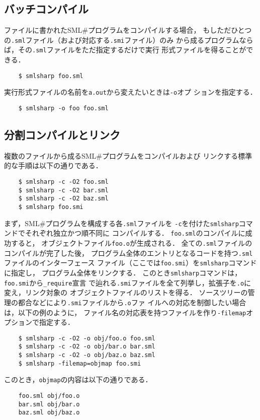 \documentclass{jbook}
\newcommand{\smlsharp}{SML\#}
\begin{document}
\subsection{バッチコンパイル}

	ファイルに書かれた\smlsharp{}プログラムをコンパイルする場合，
もしただひとつの{\tt .sml}ファイル（および対応する{\tt .smi}ファイル）のみ
から成るプログラムならば，その{\tt .sml}ファイルをただ指定するだけで実行
形式ファイルを得ることができる．
\begin{verbatim}
    $ smlsharp foo.sml
\end{verbatim}
	実行形式ファイルの名前を{\tt a.out}から変えたいときは{\tt -o}オプ
ションを指定する．
\begin{verbatim}
    $ smlsharp -o foo foo.sml
\end{verbatim}

\subsection{分割コンパイルとリンク}

	複数のファイルから成る\smlsharp{}プログラムをコンパイルおよび
リンクする標準的な手順は以下の通りである．
\begin{verbatim}
    $ smlsharp -c -O2 foo.sml
    $ smlsharp -c -O2 bar.sml
    $ smlsharp -c -O2 baz.sml
    $ smlsharp foo.smi
\end{verbatim}
	まず，\smlsharp{}プログラムを構成する各{\tt .sml}ファイルを
{\tt -c}を付けた{\tt smlsharp}コマンドでそれぞれ独立かつ順不同に
コンパイルする．
	{\tt foo.sml}のコンパイルに成功すると，
オブジェクトファイル{\tt foo.o}が生成される．
	全ての{\tt .sml}ファイルのコンパイルが完了した後，
プログラム全体のエントリとなるコードを持つ{\tt .sml}ファイルのインターフェース
ファイル（ここでは{\tt foo.smi}）を{\tt smlsharp}コマンドに指定し，
プログラム全体をリンクする．
	このとき{\tt smlsharp}コマンドは，{\tt foo.smi}から{\tt \_require}宣言
で辿れる{\tt .smi}ファイルを全て列挙し，拡張子を{\tt .o}に変え，リンク対象の
オブジェクトファイルのリストを得る．
	ソースツリーの管理の都合などにより{\tt .smi}ファイルから{\tt .o}ファ
イルへの対応を制御したい場合は，以下の例のように，
ファイル名の対応表を持つファイルを作り{\tt -filemap}オプションで指定する．
\begin{verbatim}
    $ smlsharp -c -O2 -o obj/foo.o foo.sml
    $ smlsharp -c -O2 -o obj/bar.o bar.sml
    $ smlsharp -c -O2 -o obj/baz.o baz.sml
    $ smlsharp -filemap=objmap foo.smi
\end{verbatim}
	このとき，{\tt objmap}の内容は以下の通りである．
\begin{verbatim}
    foo.sml obj/foo.o
    bar.sml obj/bar.o
    baz.sml obj/baz.o
\end{verbatim}
\end{document}
